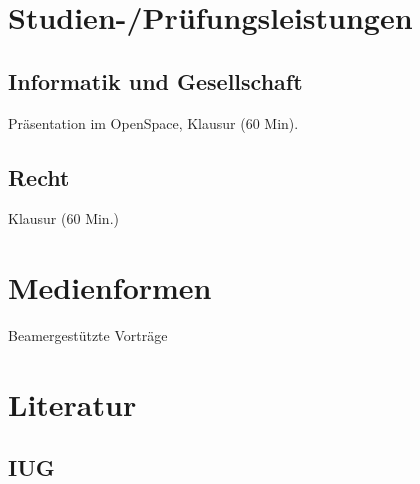 \section*{Studien-/Prüfungsleistungen\label{/mi-2017/modulbeschreibungen-bachelor/BA_MUG}}\label{studien-pruxfcfungsleistungenpathlabelmi-2017modulbeschreibungen-bachelorbaux5fmug}

\subsection*{Informatik und
Gesellschaft\label{/mi-2017/modulbeschreibungen-bachelor/BA_MUG}}\label{informatik-und-gesellschaftpathlabelmi-2017modulbeschreibungen-bachelorbaux5fmug-1}

Präsentation im OpenSpace, Klausur (60 Min).

\subsection*{Recht\label{/mi-2017/modulbeschreibungen-bachelor/BA_MUG}}\label{rechtpathlabelmi-2017modulbeschreibungen-bachelorbaux5fmug-1}

Klausur (60 Min.)

\section*{Medienformen\label{/mi-2017/modulbeschreibungen-bachelor/BA_MUG}}\label{medienformenpathlabelmi-2017modulbeschreibungen-bachelorbaux5fmug}

Beamergestützte Vorträge

\section*{Literatur\label{/mi-2017/modulbeschreibungen-bachelor/BA_MUG}}\label{literaturpathlabelmi-2017modulbeschreibungen-bachelorbaux5fmug}

\subsection*{IUG\label{/mi-2017/modulbeschreibungen-bachelor/BA_MUG}}\label{iugpathlabelmi-2017modulbeschreibungen-bachelorbaux5fmug}

